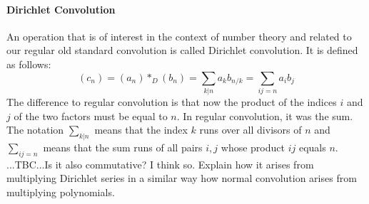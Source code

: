 \paragraph{Dirichlet Convolution}
An operation that is of interest in the context of number theory and related to our regular old standard convolution is called Dirichlet convolution. It is defined as follows: 
\begin{equation}
 (c_n) = (a_n) \ast_D (b_n) 
       = \sum_{k | n} a_k b_{n/k} 
       = \sum_{ij = n} a_i b_j 
\end{equation}
The difference to regular convolution is that now the product of the indices $i$ and $j$ of the two factors must be equal to $n$. In regular convolution, it was the sum. The notation $\sum_{k | n}$ means that the index $k$ runs over all divisors of $n$ and $\sum_{ij = n}$ means that the sum runs of all pairs $i,j$ whose product $ij$ equals $n$. ...TBC...Is it also commutative? I think so. Explain how it arises from multiplying Dirichlet series in a similar way how normal convolution arises from multiplying polynomials. 









% 

